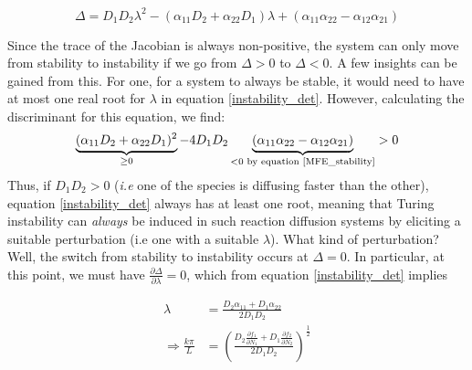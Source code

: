 \begin{equation}
	\label{instability_det}
	\Delta = D_1D_2\lambda^2 - (\alpha_{11}D_2+\alpha_{22}D_1)\lambda + (\alpha_{11}\alpha_{22}-\alpha_{12}\alpha_{21})
\end{equation}

Since the trace of the Jacobian is always non-positive, the system can only move from stability to instability if we go from $\Delta > 0$ to $\Delta < 0$. A few insights can be gained from this. For one, for a system to always be stable, it would need to have at most one real root for $\lambda$ in equation \eqref{instability_det}. However, calculating the discriminant for this equation, we find:
\begin{align*}
	\underbrace{(\alpha_{11}D_2+\alpha_{22}D_1)^2}_{\geq 0} - 4D_1D_2\underbrace{(\alpha_{11}\alpha_{22}-\alpha_{12}\alpha_{21})}_{< 0 \text{   by equation \eqref{MFE_stability}}} > 0
\end{align*}
Thus, if $D_1D_2 > 0$ (\textit{i.e} one of the species is diffusing faster than the other), equation \eqref{instability_det} always has at least one root, meaning that Turing instability can \textit{always} be induced in such reaction diffusion systems by eliciting a suitable perturbation (i.e one with a suitable $\lambda$). What kind of perturbation? Well, the switch from stability to instability occurs at $\Delta=0$. In particular, at this point, we must have $\frac{\partial \Delta}{\partial \lambda} = 0$, which from equation \eqref{instability_det} implies

\begin{align*}
	\lambda &= \frac{D_2\alpha_{11}+D_1\alpha_{22}}{2D_1D_2} \\
	\Rightarrow \frac{k\pi}{L} &= \left(\frac{D_2\frac{\partial f_1}{\partial N_1}+D_1\frac{\partial f_2}{\partial N_2}}{2D_1D_2}\right)^\frac{1}{2}
\end{align*}